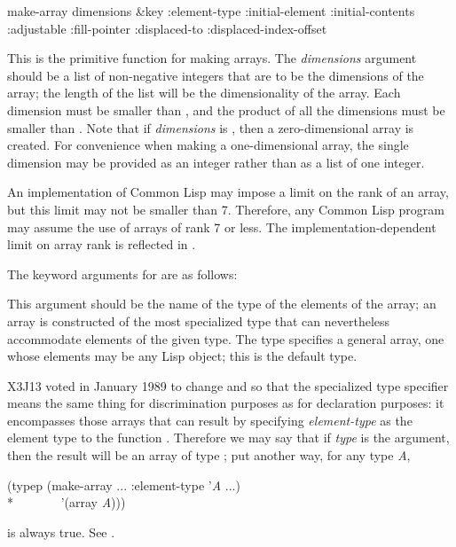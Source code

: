 \begin{defun}[Function]
make-array dimensions &key :element-type :initial-element :initial-contents :adjustable :fill-pointer :displaced-to :displaced-index-offset

This is the primitive function for making arrays.  The \emph{dimensions} argument
should be a list of non-negative integers
that are to be the dimensions of the array; the
length of the list will be the dimensionality of the array.  
Each dimension must be smaller than ,
and the product of all the dimensions must be smaller than
.
Note that if \emph{dimensions} is {\nil}, then a zero-dimensional array is created.
For convenience when making a one-dimensional array, the single dimension
may be provided as an integer rather than as a list of one integer.

An implementation of Common Lisp may impose a limit on the rank of an array,
but this limit may not be smaller than 7.  Therefore, any Common Lisp
program may assume the use of arrays of rank 7 or less.
The implementation-dependent limit on array rank is reflected in
.

The keyword arguments for  are as follows:

\begin{flushdesc}
\item[\cd{:element-type}]
This argument
should be the name of the type of the elements of the array;
an array is constructed
of the most specialized type that can nevertheless accommodate
elements of the given type.
The type {\true} specifies a general array, one whose elements may
be any Lisp object; this is the default type.

\begin{new}
X3J13 voted in January 1989
to change  and 
so that the specialized  type specifier
means the same thing for discrimination purposes
as for declaration purposes: it encompasses those arrays
that can result by specifying \emph{element-type} as the element type
to the function .  Therefore we may say
that if \emph{type} is the  argument, then
the result will be an array of type ;
put another way, for any type \emph{A},
\begin{lisp}
(typep (make-array ... :element-type '\emph{A} ...) \\*
~~~~~~~'(array \emph{A\/})))
\end{lisp}
is always true.
See .
\end{new}


\end{flushdesc}
\end{defun}
